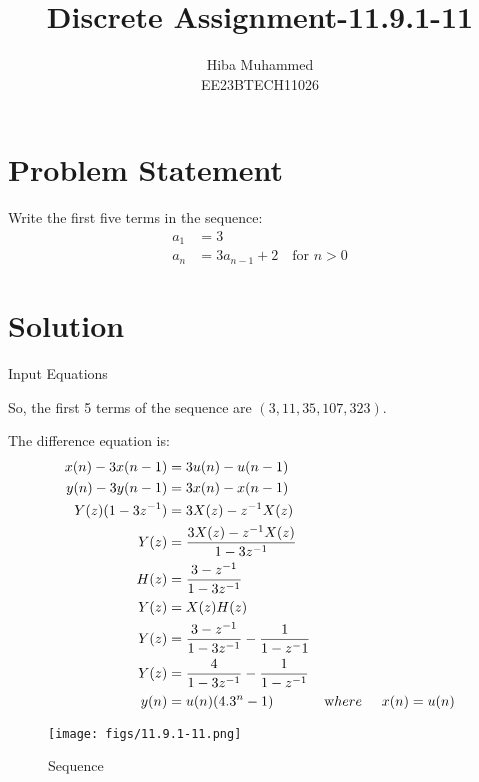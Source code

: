 \documentclass[12pt]{article}
\title{Discrete Assignment-11.9.1-11}
\author{Hiba Muhammed \\
        EE23BTECH11026}
\date{}
\begin{document}
\maketitle

\section*{Problem Statement}
Write the first five terms in the sequence:
\begin{align}
a_{1}  &= 3 \\
a_{n}  &= 3a_{n-1} + 2 \quad \text{for } n > 0
\end{align}

\section*{Solution}

\begin{table}[h]
  \centering
  
  \caption{Input Equations}
  \label{tab:input-equations}
\end{table}

So, the first 5 terms of the sequence are \( (3, 11, 35, 107, 323) \).

The difference equation is:
\begin{align}
x(n) - 3x(n-1) &= 3u(n) - u(n-1) \\
y(n) - 3y(n-1) &= 3x(n) - x(n-1)\\
Y(z)(1 - 3z^{-1}) &= 3X(z) - z^{-1}X(z) \\
Y(z) &= \frac{3X(z) - z^{-1}X(z)}{1 - 3z^{-1}}\\
H(z) &= \frac{3 - z^{-1}}{1 - 3z^{-1}}\\
Y(z) &=X(z)H(z) \\
Y(z)&=\frac{3 - z^{-1}}{1-3z^{-1}}-\frac{1}{1-z^-1}\\
Y(z)&=\frac{4}{1-3z^{-1}}-\frac{1}{1-z^{-1}}\\
y(n)&=u(n)(4.3^{n}-1) &\text where \hspace{0.5cm}x(n)=u(n)
\end{align}

\begin{figure}[h]
    \centering
    \texttt{[image: figs/11.9.1-11.png]}
    \caption{Sequence}
\end{figure}
\end{document}
